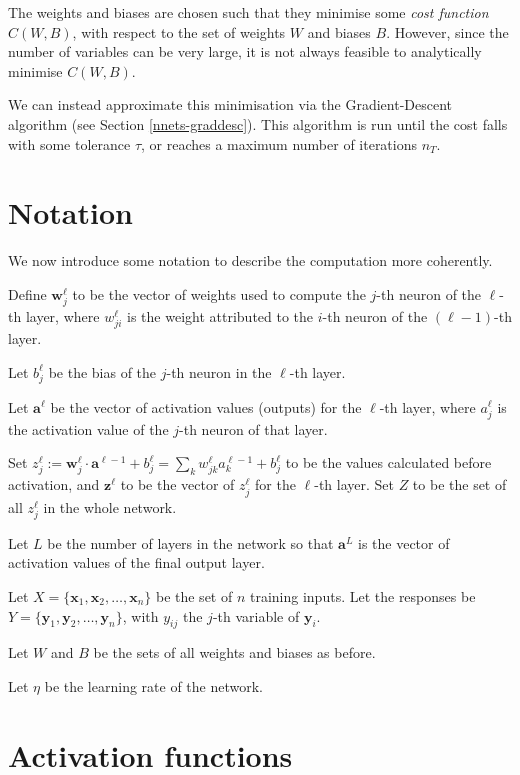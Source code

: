 The weights and biases are chosen such that they minimise some \textit{cost function} $C(W,B)$, with respect to the set of weights $W$ and biases $B$. However, since the number of variables can be very large, it is not always feasible to analytically minimise $C(W,B)$.

We can instead approximate this minimisation via the Gradient-Descent algorithm (see Section \ref{nnets-graddesc}). This algorithm is run until the cost falls with some tolerance $\tau$, or reaches a maximum number of iterations $n_T$.

\section{Notation}\label{nnets-not}

We now introduce some notation to describe the computation more coherently.

Define $\mathbf{w}^\ell_j$ to be the vector of weights used to compute the $j$-th neuron of the $\ell$-th layer, where $w_{ji}^\ell$ is the weight attributed to the $i$-th neuron of the $(\ell-1)$-th layer.

Let $b_j^\ell$ be the bias of the $j$-th neuron in the $\ell$-th layer.

Let $\mathbf{a}^\ell$ be the vector of activation values (outputs) for the $\ell$-th layer, where $a_j^\ell$ is the activation value of the $j$-th neuron of that layer.

Set $z_j^\ell := \mathbf{w}_j^\ell\cdot \mathbf{a}^{\ell-1} + b_j^\ell= \sum_k w_{jk}^\ell a_k^{\ell-1} + b_j^\ell$ to be the values calculated before activation, and $\mathbf{z}^\ell$ to be the vector of $z_j^\ell$ for the $\ell$-th layer. Set $Z$ to be the set of all $z_j^\ell$ in the whole network.

Let $L$ be the number of layers in the network so that $\mathbf{a}^L$ is the vector of activation values of the final output layer.

Let $X = \{\mathbf{x}_1, \mathbf{x}_2, \ldots, \mathbf{x}_n\}$ be the set of $n$ training inputs. Let the responses be $Y = \{\mathbf{y}_1, \mathbf{y}_2, \ldots, \mathbf{y}_n\}$, with $y_{ij}$ the $j$-th variable of $\mathbf{y}_i$.

Let $W$ and $B$ be the sets of all weights and biases as before.

Let $\eta$ be the learning rate of the network. 

\section{Activation functions}\label{nnets-act}

